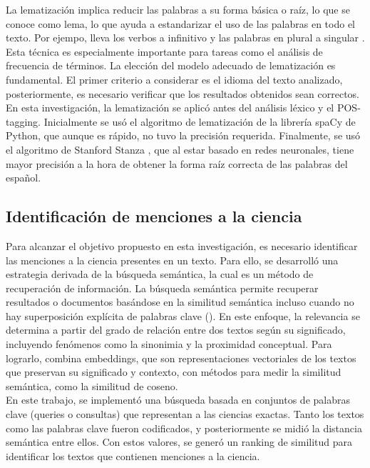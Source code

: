 \documentclass[11pt,a4paper]{article}
\begin{document}
	
	La lematización implica reducir las palabras a su forma básica o raíz, lo que se conoce como lema, lo que ayuda a estandarizar el uso de las palabras en todo el texto. Por ejempo, lleva los verbos a infinitivo y las palabras en plural a singular \cite{Orellana2018}. Esta técnica es especialmente importante para tareas como el análisis de frecuencia de términos. La elección del modelo adecuado de lematización es fundamental. El primer criterio a considerar es el idioma del texto analizado, posteriormente, es necesario verificar que los resultados obtenidos sean correctos. En esta investigación, la lematización se aplicó antes del análisis léxico y el POS-tagging. Inicialmente se usó el algoritmo de lematización de la librería spaCy de Python, que aunque es rápido, no tuvo la precisión requerida. Finalmente, se usó el algoritmo de Stanford Stanza \cite{qi2020stanza}, que al estar basado en redes neuronales, tiene mayor precisión a la hora de obtener la forma raíz correcta de las palabras del español. 
	
	
	\subsection{Identificación de menciones a la ciencia}
	Para alcanzar el objetivo propuesto en esta investigación, es necesario identificar las menciones a la ciencia presentes en un texto. Para ello, se desarrolló una estrategia derivada de la búsqueda semántica, la cual es un método de recuperación de información. La búsqueda semántica permite recuperar resultados o documentos basándose en la similitud semántica incluso cuando no hay superposición explícita de palabras clave (\cite{Wei2022}). En este enfoque, la relevancia se determina a partir del grado de relación entre dos textos según su significado, incluyendo fenómenos como la sinonimia y la proximidad conceptual. Para lograrlo, combina embeddings, que son representaciones vectoriales de los textos que preservan su significado y contexto, con métodos para medir la similitud semántica, como la similitud de coseno. \\
	
	En este trabajo, se implementó una búsqueda basada en conjuntos de palabras clave (queries o consultas) que representan a las ciencias exactas. Tanto los textos como las palabras clave fueron codificados, y posteriormente se midió la distancia semántica entre ellos. Con estos valores, se generó un ranking de similitud para identificar los textos que contienen menciones a la ciencia.
	
\end{document}
